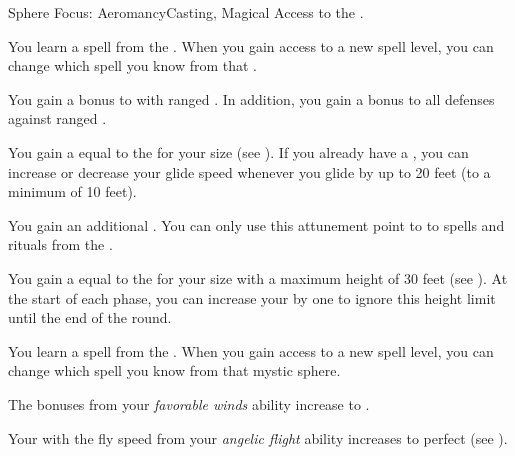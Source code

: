     \begin{feat}{Sphere Focus: Aeromancy}{Casting, Magical}
        \featpre Access to the  .

         You learn a spell from the  .
        When you gain access to a new spell level, you can change which spell you know from that .

         You gain a  bonus to  with ranged .
        In addition, you gain a  bonus to all defenses against ranged .

         You gain a  equal to the  for your size (see ).
        If you already have a , you can increase or decrease your glide speed whenever you glide by up to 20 feet (to a minimum of 10 feet).

         You gain an additional .
        You can only use this attunement point to  to spells and rituals from the  .

         You gain a  equal to the  for your size with a maximum height of 30 feet (see ).
        At the start of each phase, you can increase your  by one to ignore this height limit until the end of the round.

         You learn a spell from the  .
        When you gain access to a new spell level, you can change which spell you know from that mystic sphere.

         The bonuses from your \textit{favorable winds} ability increase to .

         Your  with the fly speed from your \textit{angelic flight} ability increases to perfect (see ).
    \end{feat}


